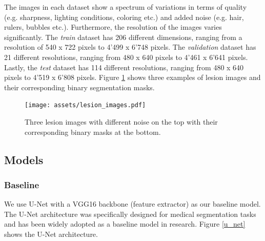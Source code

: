 The images in each dataset show a spectrum of variations in terms of quality (e.g. sharpness, lighting conditions, coloring etc.) and added noise (e.g. hair, rulers, bubbles etc.). Furthermore, the resolution of the images varies significantly. The \emph{train} dataset has 206 different dimensions, ranging from a resolution of 540 x 722 pixels to 4'499 x 6'748 pixels. The \emph{validation} dataset has 21 different resolutions, ranging from 480 x 640 pixels to 4'461 x 6'641 pixels. Lastly, the \emph{test} dataset has 114 different resolutions, ranging from 480 x 640 pixels to 4'519 x 6'808 pixels. Figure \ref{lesion_images} shows three examples of lesion images and their corresponding binary segmentation masks.

\begin{figure}[ht]
\centering
\texttt{[image: assets/lesion\_images.pdf]}
\caption[Lesion Images]
{Three lesion images with different noise on the top with their corresponding binary masks at the bottom.}
\label{lesion_images}
\end{figure}


\subsection{Models}
\subsubsection{Baseline}

We use U-Net \citep{unet-2015-ronneberger} with a VGG16 backbone (feature extractor) as our baseline model. The U-Net architecture was specifically designed for medical segmentation tasks and has been widely adopted as a baseline model in research. Figure \ref{u_net} shows the U-Net architecture.

